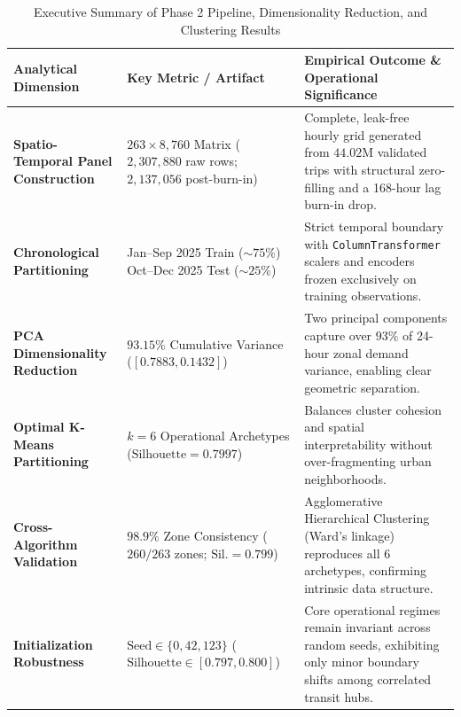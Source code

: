 \documentclass[11pt,a4paper]{article}
\begin{document}
\begin{table}[htbp]
    \centering
    \small
    \caption{Executive Summary of Phase 2 Pipeline, Dimensionality Reduction, and Clustering Results}
    \label{tab:phase2_summary_metrics}
    \begin{tabular}{@{}p{4.6cm}p{3.6cm}p{6.2cm}@{}}
        \toprule
        \textbf{Analytical Dimension} & \textbf{Key Metric / Artifact} & \textbf{Empirical Outcome \& Operational Significance} \\
        \midrule
        \textbf{Spatio-Temporal Panel Construction} & $263 \times 8,760$ Matrix \newline ($2,307,880$ raw rows; $2,137,056$ post-burn-in) & Complete, leak-free hourly grid generated from $44.02\text{M}$ validated trips with structural zero-filling and a 168-hour lag burn-in drop. \\
        \addlinespace
        \textbf{Chronological Partitioning} & Jan--Sep 2025 Train ($\sim 75\%$) \newline Oct--Dec 2025 Test ($\sim 25\%$) & Strict temporal boundary with \texttt{ColumnTransformer} scalers and encoders frozen exclusively on training observations. \\
        \addlinespace
        \textbf{PCA Dimensionality Reduction} & $93.15\%$ Cumulative Variance \newline ($[0.7883, 0.1432]$) & Two principal components capture over $93\%$ of 24-hour zonal demand variance, enabling clear geometric separation. \\
        \addlinespace
        \textbf{Optimal K-Means Partitioning} & $k = 6$ Operational Archetypes \newline ($\text{Silhouette} = 0.7997$) & Balances cluster cohesion and spatial interpretability without over-fragmenting urban neighborhoods. \\
        \addlinespace
        \textbf{Cross-Algorithm Validation} & $98.9\%$ Zone Consistency \newline ($260 / 263$ zones; $\text{Sil.} = 0.799$) & Agglomerative Hierarchical Clustering (Ward's linkage) reproduces all 6 archetypes, confirming intrinsic data structure. \\
        \addlinespace
        \textbf{Initialization Robustness} & $\text{Seed} \in \{0, 42, 123\}$ \newline ($\text{Silhouette} \in [0.797, 0.800]$) & Core operational regimes remain invariant across random seeds, exhibiting only minor boundary shifts among correlated transit hubs. \\
        \bottomrule
    \end{tabular}
\end{table}
\end{document}
